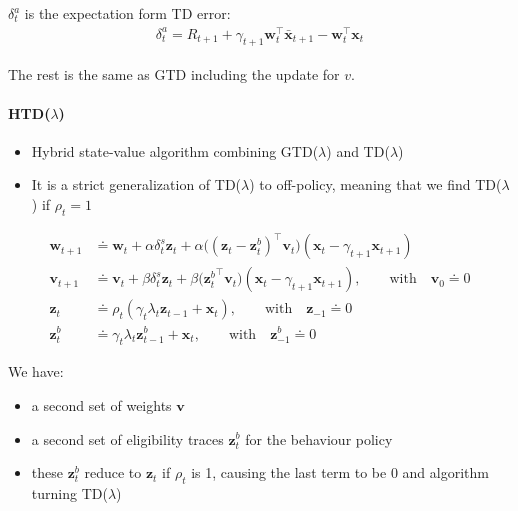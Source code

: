 \documentclass[sutton_barto_notes.tex]{subfiles}
\begin{document}
 $\delta_t^a$ is the expectation form TD error: 
\begin{align}
\delta_t^a = R_{t+1} + \gamma_{t+1} \mathbf{w}_t^{\top} \bar{\mathbf{x}}_{t+1} -  \mathbf{w}_t^{\top} \mathbf{x}_{t} \label{eq:12.39}\tag{12.39}
\end{align}

 The rest is the same as GTD including the update for $v$. 

\paragraph{HTD($\lambda$)}
\begin{itemize}
\item Hybrid state-value algorithm combining GTD($\lambda$) and TD($\lambda$) 
\item It is a strict generalization of TD($\lambda$) to off-policy, meaning that we find TD($\lambda$) if $\rho_t = 1$ 
\end{itemize}

 
\begin{align}
\mathbf{w}_{t+1} & \doteq \mathbf{w}_t + \alpha \delta_t^s \mathbf{z}_t + \alpha \big( (\mathbf{z}_t - \mathbf{z}_t^b)^{\top} \mathbf{v}_t \big) (\mathbf{x}_t - \gamma_{t+1} \mathbf{x}_{t+1}) \label{eq:12.40}\tag{12.40}\\
\mathbf{v}_{t+1} & \doteq \mathbf{v}_t + \beta \delta_t^s \mathbf{z}_t + \beta \big( {\mathbf{z}_t^b}^{\top} \mathbf{v}_t \big) (\mathbf{x}_t - \gamma_{t+1} \mathbf{x}_{t+1}), \quad \quad \text{with} \quad \mathbf{v}_{0} \doteq 0 \label{eq:12.41}\tag{12.41}\\
\mathbf{z}_{t} & \doteq \rho_t(\gamma_t \lambda_t \mathbf{z}_{t-1} + \mathbf{x}_t), \quad \quad \text{with} \quad \mathbf{z}_{-1} \doteq 0 \label{eq:12.42}\tag{12.42}\\
\mathbf{z}_{t}^b & \doteq \gamma_t \lambda_t \mathbf{z}_{t-1}^b + \mathbf{x}_t, \quad \quad \text{with} \quad \mathbf{z}_{-1}^b \doteq 0 \label{eq:12.43}\tag{12.43}
\end{align} 

 We have: 
\begin{itemize}
\item a second set of weights $\mathbf{v}$ 
\item a second set of eligibility traces $\mathbf{z}_t^b$ for the behaviour policy 
\item these $\mathbf{z}_t^b$ reduce to $\mathbf{z}_t$ if $\rho_t$ is 1, causing the last term to be $0$ and algorithm turning TD($\lambda$) 
\end{itemize}
\end{document}
